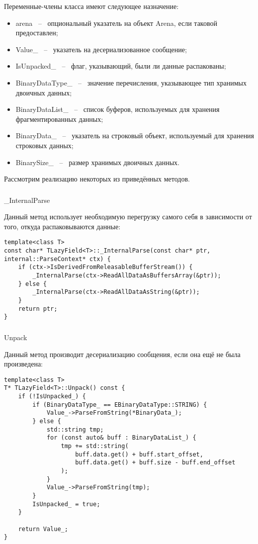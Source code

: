 Переменные-члены класса имеют следующее назначение:

\begin{itemize}
    \item arena ~--~ опциональный указатель на объект Arena, если таковой предоставлен;
    \item Value\_ ~--~ указатель на десериализованное сообщение;
    \item IsUnpacked\_ ~--~ флаг, указывающий, были ли данные распакованы;
    \item BinaryDataType\_ ~--~ значение перечисления, указывающее тип хранимых двоичных данных;
    \item BinaryDataList\_ ~--~ список буферов, используемых для хранения фрагментированных данных;
    \item BinaryData\_ ~--~ указатель на строковый объект, используемый для хранения строковых данных;
    \item BinarySize\_ ~--~ размер хранимых двоичных данных.
\end{itemize}

Рассмотрим реализацию некоторых из приведённых методов. 

\subsubsection{} \_InternalParse

Данный метод использует необходимую перегрузку самого себя в зависимости от того, откуда распаковываются данные:

\begin{lstlisting}[style=CodeListing]
template<class T>
const char* TLazyField<T>::_InternalParse(const char* ptr, internal::ParseContext* ctx) {
    if (ctx->IsDerivedFromReleasableBufferStream()) {
        _InternalParse(ctx->ReadAllDataAsBuffersArray(&ptr));
    } else {
        _InternalParse(ctx->ReadAllDataAsString(&ptr));
    }
    return ptr;
}
\end{lstlisting}

\subsubsection{} Unpack

Данный метод производит десериализацию сообщения, если она ещё не была произведена:

\begin{lstlisting}[style=CodeListing]
template<class T>
T* TLazyField<T>::Unpack() const {
    if (!IsUnpacked_) {
        if (BinaryDataType_ == EBinaryDataType::STRING) {
            Value_->ParseFromString(*BinaryData_);
        } else {
            std::string tmp;
            for (const auto& buff : BinaryDataList_) {
                tmp += std::string(
                    buff.data.get() + buff.start_offset,
                    buff.data.get() + buff.size - buff.end_offset
                );
            }
            Value_->ParseFromString(tmp);
        }
        IsUnpacked_ = true;
    }

    return Value_;
}
\end{lstlisting}

